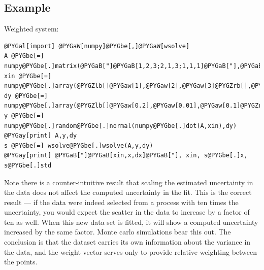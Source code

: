 \documentclass[letterpaper,10pt,english]{sphinxmanual}
\begin{document}
\subsection{Example}
\label{api/wsolve:example}
Weighted system:

\begin{Verbatim}[commandchars=@\[\]]
@PYGal[import] @PYGaW[numpy]@PYGbe[,]@PYGaW[wsolve]
A @PYGbe[=] numpy@PYGbe[.]matrix(@PYGaB["]@PYGaB[1,2,3;2,1,3;1,1,1]@PYGaB["],@PYGaB[']@PYGaB[d]@PYGaB['])@PYGbe[.]A
xin @PYGbe[=] numpy@PYGbe[.]array(@PYGZlb[]@PYGaw[1],@PYGaw[2],@PYGaw[3]@PYGZrb[],@PYGaB[']@PYGaB[d]@PYGaB['])
dy @PYGbe[=] numpy@PYGbe[.]array(@PYGZlb[]@PYGaw[0.2],@PYGaw[0.01],@PYGaw[0.1]@PYGZrb[])
y @PYGbe[=] numpy@PYGbe[.]random@PYGbe[.]normal(numpy@PYGbe[.]dot(A,xin),dy)
@PYGay[print] A,y,dy
s @PYGbe[=] wsolve@PYGbe[.]wsolve(A,y,dy)
@PYGay[print] @PYGaB["]@PYGaB[xin,x,dx]@PYGaB["], xin, s@PYGbe[.]x, s@PYGbe[.]std
\end{Verbatim}

Note there is a counter-intuitive result that scaling the estimated
uncertainty in the data does not affect the computed uncertainty in
the fit.  This is the correct result --- if the data were indeed
selected from a process with ten times the uncertainty, you would
expect the scatter in the data to increase by a factor of ten as
well.  When this new data set is fitted, it will show a computed
uncertainty increased by the same factor.  Monte carlo simulations
bear this out.  The conclusion is that the dataset carries its own
information about the variance in the data, and the weight vector
serves only to provide relative weighting between the points.
\end{document}
